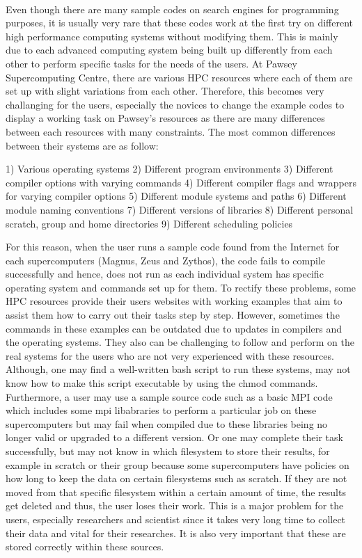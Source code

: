 \begin{Document}
{\begin{abstract}
\end{abstract}
\\
\begin{Introduction}

Even though there are many sample codes on search engines for programming purposes, it is usually very rare that these codes work at the first try 
on different high performance computing systems without modifying them. This is mainly due to each advanced computing system being built up differently
from each other to perform specific tasks for the needs of the users. At Pawsey Supercomputing Centre, there are various HPC resources where each of them
are set up with slight variations from each other. Therefore, this becomes very challanging for the users, especially the novices to change the example 
codes to display a working task on Pawsey's resources as there are many differences between each resources with many constraints. The most common 
differences between their systems are as follow:

1) Various operating systems 
2) Different program environments
3) Different compiler options with varying commands
4) Different compiler flags and wrappers for varying compiler options
5) Different module systems and paths
6) Different module naming conventions
7) Different versions of libraries
8) Different personal scratch, group and home directories
9) Different scheduling policies

For this reason, when the user runs a sample code found from the Internet for each supercomputers (Magnus, Zeus and Zythos), the code fails to compile 
successfully and hence, does not run as each individual system has specific operating system and commands set up for them. To rectify these problems, 
some HPC resources provide their users websites with working examples that aim to assist them how to carry out their tasks step by step. 
However, sometimes the commands in these examples can be outdated due to updates in compilers and the operating systems. They also can be challenging 
to follow and perform on the real systems for the users who are not very experienced with these resources. Although, one may find a well-written bash 
script to run these systems, may not know how to make this script executable by using the chmod commands. Furthermore, a user may use a sample source 
code such as a basic MPI code which includes some mpi libabraries to perform a particular job on these supercomputers but may fail when compiled due 
to these libraries being no longer valid or upgraded to a different version. Or one may complete their task successfully, but may not know in which 
filesystem to store their results, for example in scratch or their group because some supercomputers have policies on how long to keep the data on 
certain filesystems such as scratch. If they are not moved from that specific filesystem within a certain amount of time, the results get deleted and 
thus, the user loses their work. This is a major problem for the users, especially researchers and scientist since it takes very long time to collect 
their data and vital for their researches. It is also very important that these are stored correctly within these sources.


\end{Introduction}}
\end{Document}
